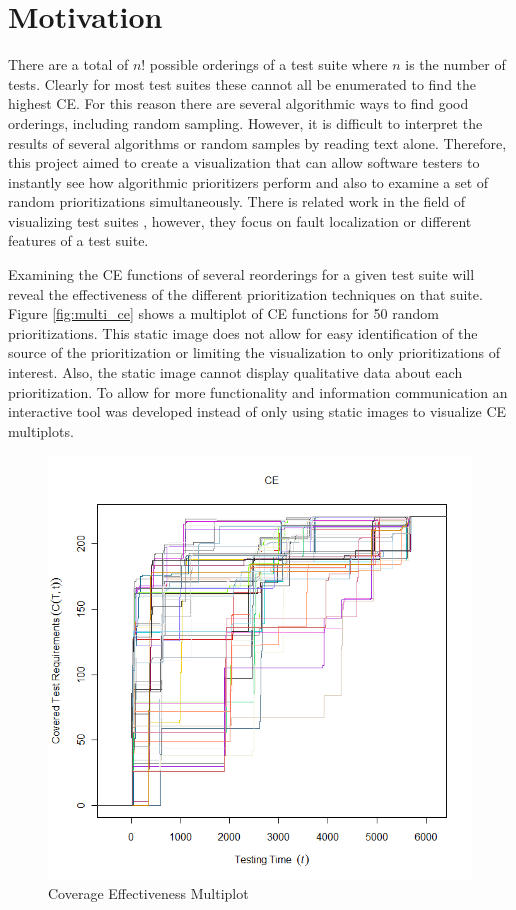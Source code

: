 \documentclass{vgtc}                          %
\begin{document}
\section{Motivation}

There are a total of $n$! possible orderings of a test suite where $n$ is the number of tests.  Clearly for most test suites these cannot all be enumerated to find the highest CE.  For this reason there are several algorithmic ways to find good orderings, including random sampling.  However, it is difficult to interpret the results of several algorithms or random samples by reading text alone.  Therefore, this project aimed to create a visualization that can allow software testers to instantly see how algorithmic prioritizers perform and also to examine a set of random prioritizations simultaneously.  There is related work in the field of visualizing test suites \cite{tarantula} \cite{bart}, however, they focus on fault localization or different features of a test suite.

Examining the CE functions of several reorderings for a given test suite will reveal the effectiveness of the different prioritization techniques on that suite.  Figure \ref{fig:multi_ce} shows a multiplot of CE functions for 50 random prioritizations.  This static image does not allow for easy identification of the source of the prioritization or limiting the visualization to only prioritizations of interest.  Also, the static image cannot display qualitative data about each prioritization.  To allow for more functionality and information communication an interactive tool was developed instead of only using static images to visualize CE multiplots.

\begin{figure}[t]
\centering
\includegraphics[scale=.25]{original}
\caption{Coverage Effectiveness Multiplot}
\end{figure}
\label{fig:multi_ce}
\end{document}
